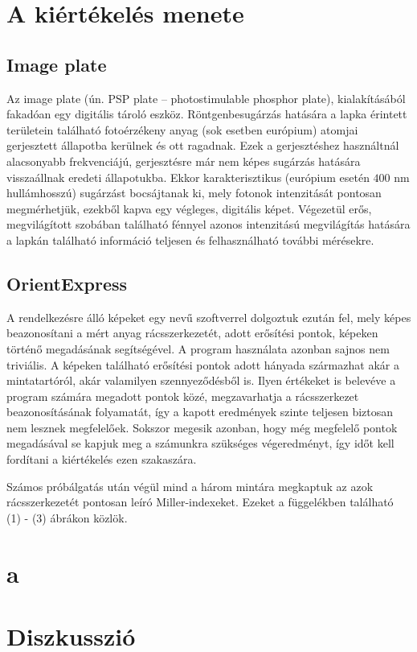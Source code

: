 \begin{multicols}{2}
\section{A kiértékelés menete}
\subsection{Image plate}
Az image plate (ún. PSP plate -- photostimulable phosphor plate), kialakításából fakadóan egy digitális tároló eszköz. Röntgenbesugárzás hatására a lapka érintett területein található fotoérzékeny anyag (sok esetben európium) atomjai gerjesztett állapotba kerülnek és ott ragadnak. Ezek a gerjesztéshez használtnál alacsonyabb frekvenciájú, gerjesztésre már nem képes sugárzás hatására visszaállnak eredeti állapotukba. Ekkor karakterisztikus (európium esetén $400$ nm hullámhosszú) sugárzást bocsájtanak ki, mely fotonok intenzitását pontosan megmérhetjük, ezekből kapva egy végleges, digitális képet. Végezetül erős, megvilágított szobában található fénnyel azonos intenzitású megvilágítás hatására a lapkán található információ teljesen  és felhasználható további mérésekre.

\subsection{OrientExpress}
A rendelkezésre álló képeket egy  nevű szoftverrel dolgoztuk ezután fel, mely képes beazonosítani a mért anyag rácsszerkezetét, adott erősítési pontok, képeken történő megadásának segítségével. A program használata azonban sajnos nem triviális. A képeken található erősítési pontok adott hányada származhat akár a mintatartóról, akár valamilyen szennyeződésből is. Ilyen  értékeket is belevéve a program számára megadott pontok közé, megzavarhatja a rácsszerkezet beazonosításának folyamatát, így a kapott eredmények szinte teljesen biztosan nem lesznek megfelelőek. Sokszor megesik azonban, hogy még megfelelő pontok megadásával se kapjuk meg a számunkra szükséges végeredményt, így időt kell fordítani a kiértékelés ezen szakaszára. \par
Számos próbálgatás után végül mind a három mintára megkaptuk az azok rácsszerkezetét pontosan leíró Miller-indexeket. Ezeket a függelékben található  (1) - (3) ábrákon közlök.

\section{a}


\section{Diszkusszió}


\end{multicols}
